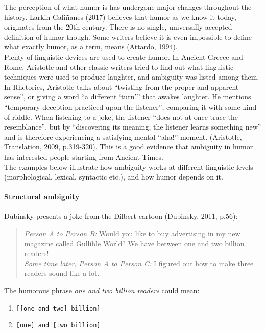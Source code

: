 \documentclass[10pt]{article}
\begin{document}
The perception of what humor is has undergone major changes throughout the history. Larkin-Galiñanes (2017) believes that humor as we know it today, originates from the 20th century. There is no single, universally accepted definition of humor though. Some writers believe it is even impossible to define what exactly humor, as a term, means (Attardo, 1994).\\[6pt]
Plenty of linguistic devices are used to create humor. In Ancient Greece and Rome, Aristotle and other classic writers tried to find out what linguistic techniques were used to produce laughter, and ambiguity was listed among them. In Rhetorics, Aristotle talks about “twisting from the proper and apparent sense”, or giving a word “a different ‘turn’” that awakes laughter. He mentions “temporary deception practiced upon the listener”, comparing it with some kind of riddle. When listening to a joke, the listener “does not at once trace the resemblance”, but by “discovering its meaning, the listener learns something new” and is therefore experiencing a satisfying mental “aha!” moment. (Aristotle, Translation, 2009, p.319-320). This is a good evidence that ambiguity in humor has interested people starting from Ancient Times.\\[6pt]
The examples below illustrate how ambiguity works at different linguistic levels (morphological, lexical, syntactic etc.), and how humor depends on it.

\paragraph{Structural ambiguity} Dubinsky presents a joke from the Dilbert cartoon (Dubinsky, 2011, p.56): 

\begin{quote}
\textit{Person A to Person B:} Would you like to buy advertising in my new magazine called Gullible World? We have between one and two billion readers!\\[6pt]
\textit{Some time later, Person A to Person C:} I figured out how to make three readers sound like a lot.
\end{quote}

The humorous phrase \textit{one and two billion readers} could mean:
\begin{enumerate}
    \item \verb|[[one and two] billion]|
    \item \verb|[one] and [two billion]|
\end{enumerate}
\end{document}
